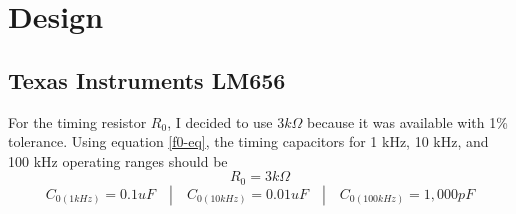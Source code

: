\documentclass[titlepage, letterpaper, 10.5pt]{article}
\begin{document}
\section{Design}

\subsection{Texas Instruments LM656}

For the timing resistor $R_{0}$, I decided to use $3k\Omega$ because it was available with 1\% tolerance.
Using equation \ref{f0-eq}, the timing capacitors for 1 kHz, 10 kHz, and 100 kHz operating ranges should be
\begin{equation*}
R_{0}=3k\Omega
\end{equation*}
\begin{equation*}
C_{0(1kHz)}=0.1uF \quad | \quad C_{0(10kHz)}=0.01uF \quad | \quad C_{0(100kHz)}=1,000pF
\end{equation*}
\end{document}
